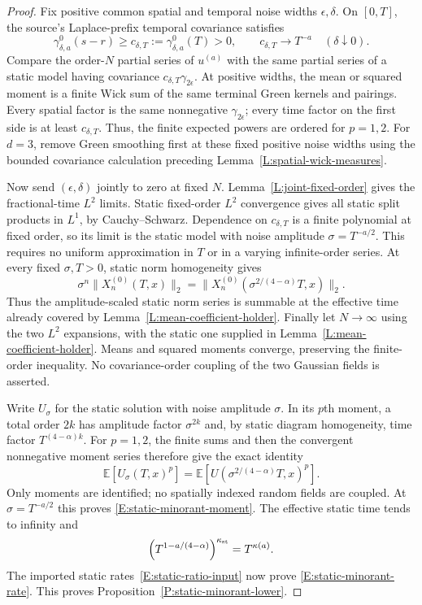 \documentclass[12pt]{article}
\numberwithin{equation}{section}
\theoremstyle{definition}
\newcommand{\E}{\mathbb{E}}
\begin{document}
\begin{proof}
  Fix positive common spatial and temporal noise widths $\epsilon,\delta$.
  On $[0,T]$, the source's Laplace-prefix temporal covariance satisfies
  \[
    \gamma_{\delta,a}^0(s-r)\ge c_{\delta,T}:=
    \gamma_{\delta,a}^0(T)>0,\qquad
    c_{\delta,T}\longrightarrow T^{-a}\quad(\delta\downarrow0).
  \]
  Compare the order-$N$ partial series of $u^{(a)}$ with the same partial
  series of a static model having covariance
  $c_{\delta,T}\gamma_{2\epsilon}$.
  At positive widths, the mean or squared moment is a finite Wick sum
  of the same terminal Green kernels and pairings. Every spatial factor
  is the same nonnegative $\gamma_{2\epsilon}$; every time factor on
  the first side is at least $c_{\delta,T}$. Thus, the finite expected
  powers are ordered for $p=1,2$. For $d=3$, remove Green smoothing
  first at these fixed positive noise widths using the bounded covariance
  calculation preceding Lemma~\ref{L:spatial-wick-measures}.

  Now send $(\epsilon,\delta)$ jointly to zero at fixed $N$.
  Lemma~\ref{L:joint-fixed-order} gives the fractional-time $L^2$ limits.
  Static fixed-order $L^2$ convergence gives all static split products
  in $L^1$, by Cauchy--Schwarz. Dependence on $c_{\delta,T}$ is a
  finite polynomial at fixed order, so its limit is the static model
  with noise amplitude $\sigma=T^{-a/2}$. This requires no uniform
  approximation in $T$ or in a varying infinite-order series.
  At every fixed $\sigma,T>0$, static norm homogeneity gives
  \[
    \sigma^n\|X_n^{(0)}(T,x)\|_2
    =\|X_n^{(0)}(\sigma^{2/(4-\alpha)}T,x)\|_2.
  \]
  Thus the amplitude-scaled static norm series is summable at the
  effective time already covered by Lemma~\ref{L:mean-coefficient-holder}.
  Finally let $N\to\infty$ using the two $L^2$ expansions, with the
  static one supplied in Lemma~\ref{L:mean-coefficient-holder}. Means and
  squared moments converge, preserving the finite-order inequality.
  No covariance-order coupling of the two Gaussian fields is asserted.

  Write $U_\sigma$ for the static solution with noise amplitude $\sigma$.
  In its $p$th moment, a total order $2k$ has amplitude factor
  $\sigma^{2k}$ and, by static diagram homogeneity, time factor
  $T^{(4-\alpha)k}$. For $p=1,2$, the finite sums and then the
  convergent nonnegative moment series therefore give the exact identity
  \[
    \E[U_\sigma(T,x)^p]
    =\E[U(\sigma^{2/(4-\alpha)}T,x)^p].
  \]
  Only moments are identified; no spatially indexed random fields are
  coupled. At $\sigma=T^{-a/2}$ this proves
  \eqref{E:static-minorant-moment}. The effective static time tends to
  infinity and
  \[
    \left(T^{1-a/(4-\alpha)}\right)^{\kappa_{\rm st}}
    =T^{\kappa(a)}.
  \]
  The imported static rates~\eqref{E:static-ratio-input} now prove
  \eqref{E:static-minorant-rate}.
  This proves Proposition~\ref{P:static-minorant-lower}.
\end{proof}
\end{document}
